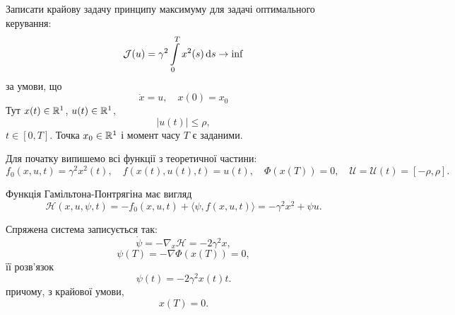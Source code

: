 \begin{solution}
\end{solution}

\begin{problem}
    Записати крайову задачу принципу максимуму для задачі оптимального керування:
    \begin{equation*}
        \mathcal{J}(u) = \gamma^2 \displaystyle\int\limits_0^T x^2(s) \, \mathrm{d} s \to \inf
    \end{equation*}
    за умови, що
    \begin{equation*}
        \dot x = u, \quad x(0) = x_0
    \end{equation*}
    Тут $x(t) \in \mathbb{R}^1$, $u(t) \in \mathbb{R}^1$,
    \begin{equation*}
        |u(t)|\le \rho,
    \end{equation*}
    $t \in [0, T]$. Точка $x_0 \in \mathbb{R}^1$ і момент часу $T$ є заданими.
\end{problem}

\begin{solution}
    Для початку випишемо всі функції з теоретичної частини:
    \begin{equation}
        f_0(x, u, t) = \gamma^2 x^2(t), \quad f(x(t), u(t), t) = u(t), \quad \Phi(x(T)) = 0, \quad \mathcal{U} = \mathcal{U}(t) = [-\rho, \rho].
    \end{equation}
    
    Функція Гамільтона-Понтрягіна має вигляд
    \begin{equation}
        \mathcal{H} (x, u, \psi, t) = - f_0(x, u, t) + \langle \psi, f(x, u, t) \rangle = - \gamma^2 x^2 + \psi u.
    \end{equation}
    
    Спряжена система записується так:
    \begin{equation} 
        \dot \psi = - \nabla_x \mathcal{H} = - 2 \gamma^2 x,
    \end{equation}
    \begin{equation} 
        \psi(T) = - \nabla \Phi(x(T)) = 0,
    \end{equation}
    її розв'язок 
    \begin{equation}
        \psi(t) = - 2 \gamma^2 x(t) t.
    \end{equation}
    причому, з крайової умови,
    \begin{equation}
        x(T) = 0.
    \end{equation}
\end{solution}


